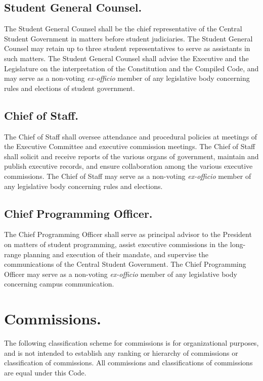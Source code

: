 \subsection{Student General Counsel.}
The Student General Counsel shall be the chief representative of the Central Student Government in matters before student judiciaries. The Student General Counsel may retain up to three student representatives to serve as assistants in such matters. The Student General Counsel shall advise the Executive and the Legislature on the interpretation of the Constitution and the Compiled Code, and may serve as a non-voting \textit{ex-officio} member of any legislative body concerning rules and elections of student government.

\subsection{Chief of Staff.}
The Chief of Staff shall oversee attendance and procedural policies at meetings of the Executive Committee and executive commission meetings. The Chief of Staff shall solicit and receive reports of the various organs of government, maintain and publish executive records, and ensure collaboration among the various executive commissions. The Chief of Staff may serve as a non-voting \textit{ex-officio} member of any legislative body concerning rules and elections.

\subsection{Chief Programming Officer.}
The Chief Programming Officer shall serve as principal advisor to the President on matters of student programming, assist executive commissions in the long-range planning and execution of their mandate, and supervise the communications of the Central Student Government. The Chief Programming Officer may serve as a non-voting \textit{ex-officio} member of any legislative body concerning campus communication.


\section{Commissions.}  The following classification scheme for commissions is for organizational purposes, and is not intended to establish any ranking or hierarchy of commissions or classification of commissions.  All commissions and classifications of commissions are equal under this Code.

